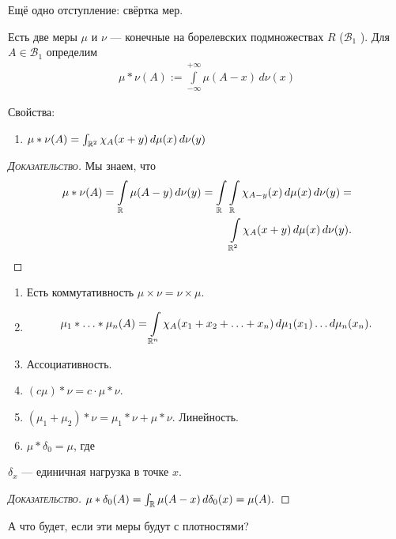 Ещё одно отступление: свёртка мер.

Есть две меры $ \mu $ и $ \nu $ --- конечные на борелевских подмножествах $ R $ ($ \mathcal B_1 $ ). Для $ A \in \mathcal B_1 $ определим
 \begin{align*}
 \mu \ast \nu(A) := \int\limits_{-\infty}^{+\infty} \mu(A-x)\,d\nu(x)
\end{align*}

Свойства:
\begin{enumerate}
 \item $ \mu \ast \nu(A) = \int_{\mathbb{R}^{2}} \chi_{A}(x + y) \, d\mu(x)\, d\nu(y)   $
\end{enumerate}
\begin{proof}[\normalfont\textsc{Доказательство}]
 Мы знаем, что
 \begin{align*}
 \mu \ast \nu(A) = \int\limits_{\mathbb{R}} \mu(A-y) \,d\nu(y) = \int\limits_{\mathbb{R}} \int\limits_{\mathbb{R}} \chi_{A-y}(x)\,d\mu(x)\,d\nu(y) = \\
 \int\limits_{\mathbb{R}^{2}}  \chi_A(x+y)\,d\mu(x)\,d\nu(y).
 \end{align*} 
\end{proof}
\begin{enumerate}
 \item Есть коммутативность $ \mu \times \nu = \nu \times \mu $.
 \item 
\begin{align*}
 \mu_1 \ast \ldots \ast \mu_n (A) = \int\limits_{\mathbb{R}^{n}}\chi_A(x_1 + x_2 + \ldots + x_n)\,d\mu_1(x_1) \ldots d\mu_n(x_n).   
\end{align*}
\item Ассоциативность.
\item $ (c\mu) \ast \nu = c \cdot \mu \ast \nu $.
\item $ (\mu_1 + \mu_2) \ast \nu = \mu_1 \ast \nu + \mu \ast \nu $. Линейность.
\item $ \mu \ast \delta_0 = \mu $, где
\end{enumerate}
\begin{df}
 $ \delta_x  $ --- единичная нагрузка в точке $ x $.
\end{df}
\begin{proof}[\normalfont\textsc{Доказательство}]
 $ \mu \ast \delta_0(A) = \int_{\mathbb{R}} \mu(A-x)\,d\delta_0(x) = \mu(A).  $
\end{proof}

А что будет, если эти меры будут с плотностями?

